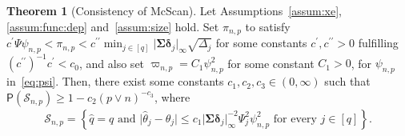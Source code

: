 \documentclass[11pt, a4paper]{article}
\newcommand{\mc}{\mathcal}
\renewcommand{\l}{\left}
\renewcommand{\r}{\right}
\def\wh{\widehat}
\newcommand{\cp}{\theta}
\newcommand{\p}{\mathsf{P}}
\theoremstyle{definition}
\newtheorem{thm}{Theorem}
\theoremstyle{definition}
\theoremstyle{definition}
\theoremstyle{definition}
\theoremstyle{definition}
\theoremstyle{remark}
\theoremstyle{definition}
\theoremstyle{definition}
\theoremstyle{definition}
\begin{document}
\begin{thm}[Consistency of McScan]
	\label{thm:one}
	Let Assumptions~\ref{assum:xe}, \ref{assum:func:dep} and~\ref{assum:size} hold. 
	Set $\pi_{n, p}$ to satisfy $c^\prime \Psi \psi_{n, p} < \pi_{n, p} < c^{\prime\prime} \min_{j \in [q]} \vert \bm\Sigma \bm\delta_j \vert_\infty \sqrt{\Delta_j}$ for some constants $c^\prime, c^{\prime\prime} > 0$ fulfilling $(c^{\prime\prime})^{-1} c^\prime < c_0$, and also set $\varpi_{n, p} = C_1 \psi_{n, p}^2$ for some constant $C_1 > 0$, for $\psi_{n, p}$ in~\eqref{eq:psi}.
	Then, there exist some constants $c_1, c_2, c_3 \in (0, \infty)$ such that 
	$\p(\mc S_{n, p}) \ge 1 - c_2 (p \vee n)^{-c_3}$, where
	\begin{align*}
	\mc S_{n, p} = \l\{ \wh q = q \text{ \ and \ } \vert \wh\cp_j - \cp_j \vert \le 
	c_1 \vert \bm\Sigma\bm\delta_j\vert_\infty^{-2}\Psi_j^2 \psi_{n, p}^2 \text{ for every }j \in [q]\r\}.
	\end{align*}
\end{thm}
\end{document}
